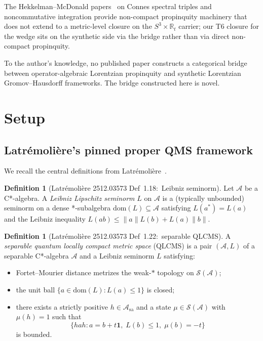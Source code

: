 \documentclass[11pt,a4paper]{article}
\theoremstyle{plain}
\theoremstyle{definition}
\newtheorem{definition}[theorem]{Definition}
\newcommand{\sthree}{S^{3}}
\newcommand{\Acal}{\mathcal{A}}
\newcommand{\Scal}{\mathcal{S}}
\newcommand{\norm}[1]{\lVert #1 \rVert}
\newcommand{\R}{\mathbb{R}}
\begin{document}
The Hekkelman--McDonald papers~\cite{hekkelman_mcdonald2024} on Connes spectral triples and
noncommutative integration provide non-compact propinquity machinery
that does not extend to a metric-level closure on the
$\sthree \times \R_{t}$ carrier; our T6 closure for the wedge sits on
the synthetic side via the bridge rather than via direct non-compact
propinquity.

To the author's knowledge, no published paper constructs a categorical
bridge between operator-algebraic Lorentzian propinquity and synthetic
Lorentzian Gromov--Hausdorff frameworks. The bridge constructed here
is novel.

\section{Setup}\label{sec:setup}

\subsection{Latr\'emoli\`ere's pinned proper QMS
framework}\label{sec:latremoliere_recap}

We recall the central definitions from
Latr\'emoli\`ere~\cite{latremoliere2025_hypertopology}.

\begin{definition}[Latr\'emoli\`ere 2512.03573 Def~1.18:\
Leibniz seminorm]\label{def:leibniz}
Let $\Acal$ be a C*-algebra. A \emph{Leibniz Lipschitz seminorm}
$L$ on $\Acal$ is a (typically unbounded) seminorm on a dense
*-subalgebra $\mathrm{dom}(L) \subseteq \Acal$ satisfying $L(a^{*}) = L(a)$
and the Leibniz inequality
$L(ab) \le \norm{a} L(b) + L(a) \norm{b}$.
\end{definition}

\begin{definition}[Latr\'emoli\`ere 2512.03573 Def~1.22:\ separable
QLCMS]\label{def:sep_qlcms}
A \emph{separable quantum locally compact metric space} (QLCMS) is a
pair $(\Acal, L)$ of a separable C*-algebra $\Acal$ and a Leibniz
seminorm $L$ satisfying:
\begin{itemize}
\item[(FM)] Fortet--Mourier distance metrizes the weak-$*$
topology on $\Scal(\Acal)$;
\item[(CB)] the unit ball $\{a \in \mathrm{dom}(L) : L(a) \le 1\}$ is
closed;
\item[(B)] there exists a strictly positive $h \in \Acal_{\mathrm{sa}}$
and a state $\mu \in \Scal(\Acal)$ with $\mu(h) = 1$ such that
\[
\{h a h : a = b + t\mathbf{1},\; L(b) \le 1,\; \mu(b) = -t\}
\]
is bounded.
\end{itemize}
\end{definition}
\end{document}
